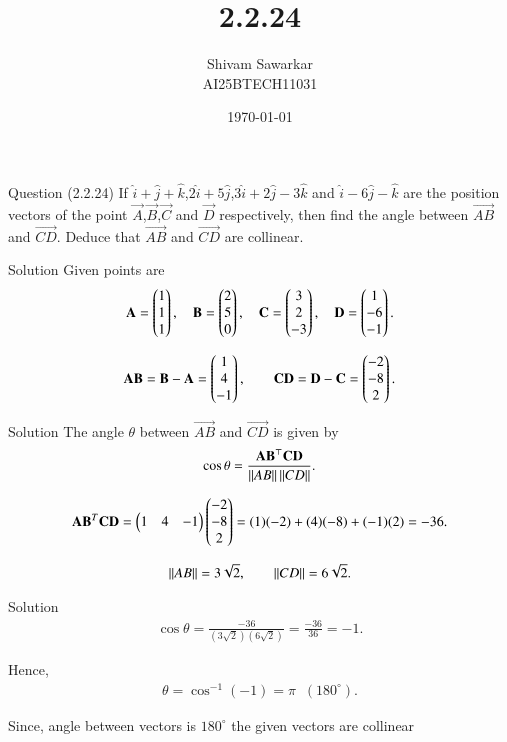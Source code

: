 \documentclass{beamer}
\title %
{2.2.24}
\date{\today}
\author %
{Shivam Sawarkar \\ AI25BTECH11031}
\begin{document}
\frame{\titlepage}
\begin{frame}{Question (2.2.24)}
    If $\hat{i}+\hat{j}+\hat{k}$,$2\hat{i}+5\hat{j}$,$3\hat{i}+2\hat{j}-3\hat{k}$ and $\hat{i}-6\hat{j}-\hat{k}$ are the position vectors of the point $\Vec{A}$,$\Vec{B}$,$\Vec{C}$ and $\Vec{D}$ respectively, then find the angle between $\Vec{AB}$ and $\Vec{CD}$. Deduce that $\Vec{AB}$ and $\Vec{CD}$ are collinear.
\end{frame}

\begin{frame}{Solution}
    Given points are
\begin{align}
\mathbf{A}=\begin{pmatrix}1\\1\\1\end{pmatrix}, \quad
\mathbf{B}=\begin{pmatrix}2\\5\\0\end{pmatrix}, \quad
\mathbf{C}=\begin{pmatrix}3\\2\\-3\end{pmatrix}, \quad
\mathbf{D}=\begin{pmatrix}1\\-6\\-1\end{pmatrix}.
\end{align}

\begin{align}
\mathbf{AB} = \mathbf{B}-\mathbf{A} = \begin{pmatrix}1\\4\\-1\end{pmatrix}, 
\qquad
\mathbf{CD} = \mathbf{D}-\mathbf{C} = \begin{pmatrix}-2\\-8\\2\end{pmatrix}.
\end{align}
\end{frame}

\begin{frame}{Solution}
    The angle $\theta$ between $\vec{AB}$ and $\vec{CD}$ is given by
\begin{align}
\cos\theta = \frac{\mathbf{AB}^{\top}\mathbf{CD}}{\left\lVert AB\right\rVert\left\lVert CD\right\rVert}.
\end{align}

\begin{align}
\mathbf{AB}^T \mathbf{CD} =
\begin{pmatrix}1 & 4 & -1\end{pmatrix}
\begin{pmatrix}-2\\-8\\2\end{pmatrix}
= (1)(-2)+(4)(-8)+(-1)(2) = -36.
\end{align}

\begin{align}
\left\lVert AB\right\rVert =3\sqrt{2}, 
\qquad
\left\lVert CD\right\rVert = 6\sqrt{2}.
\end{align}
\end{frame}

\begin{frame}{Solution}
    \begin{align}
\cos\theta = \frac{-36}{(3\sqrt{2})(6\sqrt{2})} 
= \frac{-36}{36}=-1.
\end{align}

Hence,
\begin{align}
\theta = \cos^{-1}(-1) = \pi \;\;(180^\circ).
\end{align}

Since, angle between vectors is $180^\circ$ the given vectors are collinear
\end{frame}
\end{document}
